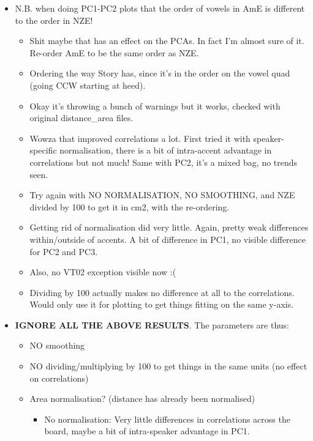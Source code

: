 \documentclass{article}
\begin{document}
\begin{itemize}
\begin{itemize}
\begin{itemize}
\begin{itemize}
            \end{itemize}
            \item N.B. when doing PC1-PC2 plots that the order of vowels in AmE is different to the order in NZE!
            \begin{itemize}
                \item Shit maybe that has an effect on the PCAs. In fact I'm almost sure of it. Re-order AmE to be the same order as NZE.
                \item Ordering the way Story has, since it's in the order on the vowel quad (going CCW starting at heed).
                \item Okay it's throwing a bunch of warnings but it works, checked with original distance\_area files.
                \item Wowza that improved correlations a lot. First tried it with speaker-specific normalisation,
                there is a bit of intra-accent advantage in correlations but not much! Same with PC2, it's a mixed bag, no trends seen.
                \item Try again with NO NORMALISATION, NO SMOOTHING, and NZE divided by 100 to get it in cm2, with the re-ordering.
                \item Getting rid of normalisation did very little. Again, pretty weak differences within/outside of accents. A bit of difference in PC1, no visible difference for PC2 and PC3.
                \item Also, no VT02 exception visible now :(
                \item Dividing by 100 actually makes no difference at all to the correlations. Would only use it for plotting to get things fitting on the same y-axis.
            \end{itemize}
            \item \textbf{IGNORE ALL THE ABOVE RESULTS}. The parameters are thus:
            \begin{itemize}
                \item NO smoothing
                \item NO dividing/multiplying by 100 to get things in the same units (no effect on correlations)
                \item Area normalisation? (distance has already been normalised)
                \begin{itemize}
                    \item No normalisation: Very little differences in correlations across the board, maybe a bit of intra-speaker advantage in PC1.

\end{itemize}
\end{itemize}
\end{itemize}
\end{itemize}
\end{itemize}
\end{document}
